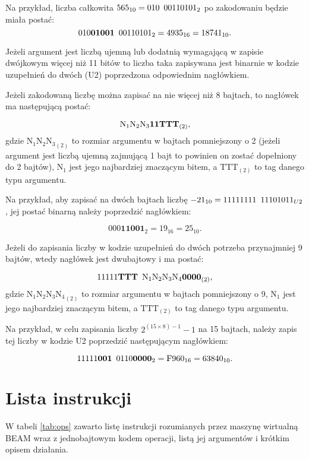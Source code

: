 Na przykład, liczba całkowita $565_{10} = {010 \enskip 00110101}_{2}$ po zakodowaniu będzie miała postać:
$${010\mathbf{01001} \enskip 00110101}_{2} = 4935_{16} = 18741_{10}.$$

Jeżeli argument jest liczbą ujemną lub dodatnią wymagającą w zapisie dwójkowym więcej niż 11 bitów to liczba taka zapisywana jest binarnie w kodzie uzupełnień do dwóch (U2) poprzedzona odpowiednim nagłówkiem.

Jeżeli zakodowaną liczbę można zapisać na nie więcej niż 8 bajtach, to nagłówek ma następującą postać:

$$ {\text{N}_1\text{N}_2\text{N}_3 \mathbf{11} \text{\textbf{TTT}}}_{(2)}, $$
gdzie ${\text{N}_1\text{N}_2\text{N}_3}_{(2)}$ to rozmiar argumentu w bajtach pomniejszony o 2 (jeżeli argument jest liczbą ujemną zajmującą 1 bajt to powinien on zostać dopełniony do 2 bajtów), $\text{N}_1$ jest jego najbardziej znaczącym bitem, a $\text{TTT}_{(2)}$ to tag danego typu argumentu.

Na przykład, aby zapisać na dwóch bajtach liczbę $-21_{10} = {11111111 \enskip 11101011}_{U2}$, jej postać binarną należy poprzedzić nagłówkiem:

$${000\mathbf{11001}}_{2} = 19_{16} = 25_{10}.$$

Jeżeli do zapisania liczby w kodzie uzupełnień do dwóch potrzeba przynajmniej 9 bajtów, wtedy nagłówek jest dwubajtowy i ma postać:

$$ {11111\text{\textbf{TTT}} \enskip \text{N}_1\text{N}_2\text{N}_3\text{N}_4 \mathbf{0000}}_{(2)}, $$
gdzie ${\text{N}_1\text{N}_2\text{N}_3\text{N}_4}_{(2)}$ to rozmiar argumentu w bajtach pomniejszony o 9, $\text{N}_1$ jest jego najbardziej znaczącym bitem, a $\text{TTT}_{(2)}$ to tag danego typu argumentu.

Na przykład, w celu zapisania liczby $2^{(15 \times 8)-1}-1$ na 15 bajtach, należy zapis tej liczby w kodzie U2 poprzedzić następującym nagłówkiem:

$${11111\mathbf{001} \enskip 0110\mathbf{0000}}_{2} = \text{F}960_{16} = 63840_{10}.$$

\section{Lista instrukcji}
\label{sec:opsOps}
W tabeli \ref{tab:ops} zawarto listę instrukcji rozumianych przez maszynę wirtualną BEAM wraz z jednobajtowym kodem operacji, listą jej argumentów i krótkim opisem działania.


